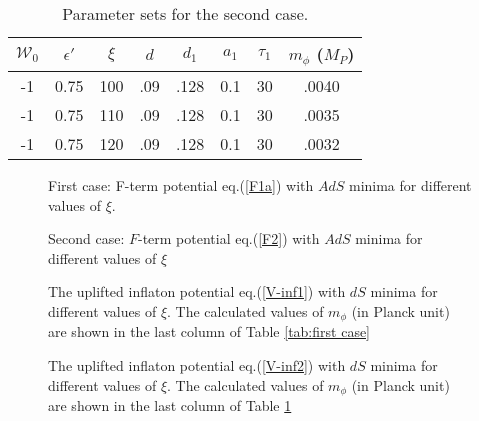 \documentclass[doublecol]{epl2}
\begin{document}
\begin{table}[H]
    \centering
    \caption{Parameter sets for the second case.}
    \begin{tabular}{|c|c|c|c|c|c|c|c|}
    \hline
    $\mathcal{W}_0$ & $\epsilon'$ &  $\xi$ & $d$ & $d_1$ & $a_1$ & $\tau_1$ & $m_\phi$ ($M_P$) \\
    \hline
        -1 & 0.75 & 100 & .09 & .128 & 0.1 & 30 & .0040  \\
        -1 & 0.75 & 110 & .09 & .128 & 0.1 & 30 & .0035  \\
         -1 & 0.75 & 120 & .09 & .128 & 0.1 & 30 & .0032  \\
         \hline
    \end{tabular}
    \label{tab:second case}
\end{table}
\begin{figure}[H]\large
  \centering
{}
    \caption{First case: F-term potential eq.(\ref{F1a}) with $AdS$ minima for different values of $\xi$.}
    \label{fig case-1-ads}   
   \end{figure}
   \begin{figure}[H]\large
  \centering
    \caption{Second case: $F$-term potential eq.(\ref{F2}) with $AdS$ minima for different values of $\xi$}
    \label{fig case-2 ads}   
   \end{figure}  
\begin{figure}[H]\large
  \centering
{}
    \caption{The uplifted inflaton potential eq.(\ref{V-inf1}) with $dS$ minima for different values of $\xi$. The calculated values of $m_\phi$ (in Planck unit) are shown in the last column of Table \ref{tab:first case}}
    \label{fig case-1 inf}   
   \end{figure}
 
\begin{figure}[H]
  \centering
    \caption{The uplifted inflaton potential eq.(\ref{V-inf2}) with $dS$ minima for different values of $\xi$. The calculated values of $m_\phi$ (in Planck unit) are shown in the last column of Table \ref{tab:second case}}
    \label{fig case-2 inf}   
   \end{figure} 
     
\end{document}
